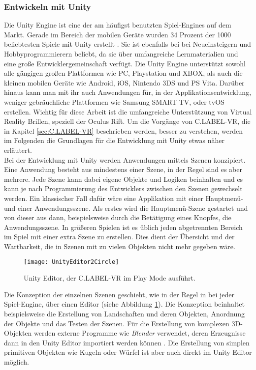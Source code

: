 \subsubsection{Entwickeln mit Unity}
\label{sec:UnityDevelopment}

Die Unity Engine ist eine der am häufigst benutzten Spiel-Engines auf dem Markt. Gerade im Bereich der mobilen Geräte wurden 34 Prozent der 1000 beliebtesten Spiele mit Unity erstellt \cite{bib:Unity34Percent}. Sie ist ebenfalls bei bei Neueinsteigern und Hobbyprogrammierern beliebt, da sie über umfangreiche Lernmaterialien und eine große Entwicklergemeinschaft verfügt. Die Unity Engine unterstützt sowohl alle gängigen großen Plattformen wie PC, Playstation und XBOX, als auch die kleinen mobilen Geräte wie Android, iOS, Nintendo 3DS und PS Vita. Darüber hinaus kann man mit ihr auch Anwendungen für, in der Applikationsentwicklung, weniger gebräuchliche Plattformen wie Samsung SMART TV, oder tvOS erstellen. Wichtig für diese Arbeit ist die umfangreiche Unterstützung von Virtual Reality Brillen, speziell der Oculus Rift. Um die Vorgänge von C.LABEL-VR, die in Kapitel \ref{sec:C.LABEL-VR} beschrieben werden, besser zu verstehen, werden im Folgenden die Grundlagen für die Entwicklung mit Unity etwas näher erläutert.\\ 

Bei der Entwicklung mit Unity werden Anwendungen mittels Szenen konzipiert. Eine Anwendung besteht aus mindestens einer Szene, in der Regel sind es aber mehrere. Jede Szene kann dabei eigene Objekte und Logiken beinhalten und es kann je nach Programmierung des Entwicklers zwischen den Szenen gewechselt werden. Ein klassischer Fall dafür wäre eine Applikation mit einer Hauptmenü- und einer Anwendungsszene. Als erstes wird die Hauptmenü-Szene gestartet und von dieser aus dann, beispielsweise durch die Betätigung eines Knopfes, die Anwendungsszene. In größeren Spielen ist es üblich jeden abgetrennten Bereich im Spiel mit einer extra Szene zu erstellen. Dies dient der Übersicht und der Wartbarkeit, die in Szenen mit zu vielen Objekten nicht mehr gegeben wäre.\\

\begin{figure}%
	\centering
    \texttt{[image: UnityEditor2Circle]}
    \caption{Unity Editor, der C.LABEL-VR im Play Mode ausführt.}
    \label{fig:UnityEditor}
\end{figure}

Die Konzeption der einzelnen Szenen geschieht, wie in der Regel in bei jeder Spiel-Engine, über einen Editor (siehe Abbildung \ref{fig:UnityEditor}). 
Die Konzeption beinhaltet beispielsweise die Erstellung von Landschaften und deren Objekten, Anordnung der Objekte und das Testen der Szenen. Für die Erstellung von komplexen 3D-Objekten werden externe Programme wie \textit{Blender} verwendet, deren  Erzeugnisse dann in den Unity Editor importiert werden können \cite{bib:Blender}. Die Erstellung von simplen primitiven Objekten wie Kugeln oder Würfel ist aber auch direkt im Unity Editor möglich.

